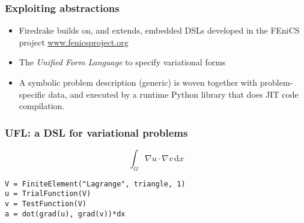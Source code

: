 \documentclass[presentation]{beamer}
\begin{document}
\begin{frame}
  \frametitle{Exploiting abstractions}
  \begin{itemize}
  \item Firedrake builds on, and extends, embedded DSLs developed in
    the FEniCS project \url{www.fenicsproject.org}
  \item The \emph{Unified Form Language} \parencite{Alnaes:2014} to
    specify variational forms
  \item A symbolic problem description (generic) is woven together with
    problem-specific data, and executed by a runtime Python library
    that does JIT code compilation.
  \end{itemize}
\end{frame}
\begin{frame}[fragile]
  \frametitle{UFL: a DSL for variational problems}
  \begin{equation*}
    \int_\Omega \nabla u \cdot \nabla v\,\text{d}x
  \end{equation*}

\begin{verbatim}
V = FiniteElement("Lagrange", triangle, 1)
u = TrialFunction(V)
v = TestFunction(V)
a = dot(grad(u), grad(v))*dx
\end{verbatim}
\end{frame}
\end{document}
